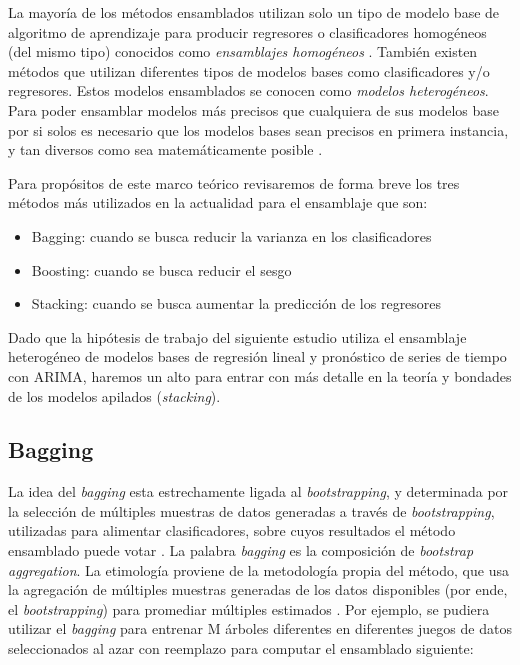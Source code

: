 La mayoría de los métodos ensamblados utilizan solo un tipo de modelo base de algoritmo de aprendizaje para producir regresores o clasificadores homogéneos (del mismo tipo) conocidos como \textit{ensamblajes homogéneos} \cite{smolyakov}. También existen métodos que utilizan diferentes tipos de modelos bases como clasificadores y/o regresores. Estos modelos ensamblados se conocen como \textit{modelos heterogéneos}. Para poder ensamblar modelos más precisos que cualquiera de sus modelos base por si solos es necesario que los modelos bases sean precisos en primera instancia, y tan diversos como sea matemáticamente posible \cite{smolyakov}.

Para propósitos de este marco teórico revisaremos de forma breve los tres métodos más utilizados en la actualidad para el ensamblaje que son:
\begin{itemize}
  \item Bagging: cuando se busca reducir la varianza en los clasificadores
  \item Boosting: cuando se busca reducir el sesgo 
  \item Stacking: cuando se busca aumentar la predicción de los regresores
\end{itemize}

Dado que la hipótesis de trabajo del siguiente estudio utiliza el ensamblaje heterogéneo de modelos bases de regresión lineal y pronóstico de series de tiempo con ARIMA, haremos un alto para entrar con más detalle en la teoría y bondades de los modelos apilados (\emph{stacking}).

\subsection{Bagging}
La idea del \emph{bagging} esta estrechamente ligada al \emph{bootstrapping}, y determinada por la selección de múltiples muestras de datos generadas a través de \emph{bootstrapping}, utilizadas para alimentar clasificadores, sobre cuyos resultados el método ensamblado puede votar \cite{daume}. La palabra \emph{bagging} es la composición de \emph{bootstrap aggregation}. La etimología proviene de la metodología propia del método, que usa la agregación de múltiples muestras generadas de los datos disponibles (por ende, el \emph{bootstrapping}) para promediar múltiples estimados \cite{smolyakov}. 
Por ejemplo, se pudiera utilizar el \emph{bagging} para entrenar M árboles diferentes en diferentes juegos de datos seleccionados al azar con reemplazo para computar el ensamblado siguiente:  

